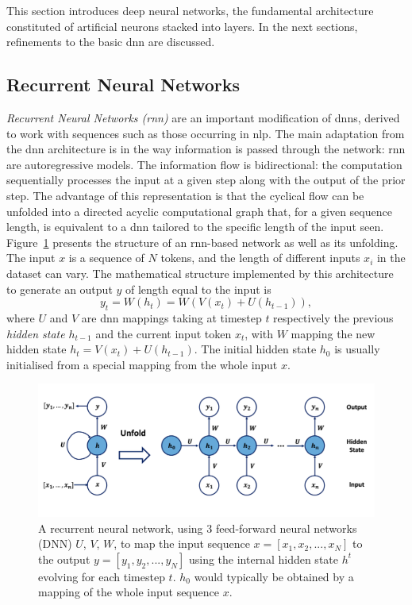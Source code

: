This section introduces deep neural networks, the fundamental architecture constituted of artificial neurons stacked into layers. In the next sections, refinements to the basic \gls{dnn} are discussed.

\subsection{Recurrent Neural Networks}\label{sec:RNN}
\textit{Recurrent Neural Networks (\gls{rnn})} are an important modification of \glspl{dnn}, derived to work with sequences such as those occurring in \gls{nlp}. The main adaptation from the \gls{dnn} architecture is in the way information is passed through the network: \gls{rnn} are autoregressive models. The information flow is bidirectional: the computation sequentially processes the input at a given step along with the output of the prior step. The advantage of this representation is that the cyclical flow can be unfolded into a directed acyclic computational graph that, for a given sequence length, is equivalent to a \gls{dnn} tailored to the specific length of the input seen. Figure~\ref{fig:rnnNet} presents the structure of an \gls{rnn}-based network as well as its unfolding. The input $x$ is a sequence of $N$ tokens, and the length of different inputs $x_i$ in the dataset can vary. The mathematical structure implemented by this architecture to generate an output $y$ of length equal to the input is
\begin{equation}\label{eq:rnnModel}
    y_t = W(h_t) = W(V(x_t) + U(h_{t-1})),
\end{equation}
where $U$ and $V$ are \gls{dnn} mappings taking at timestep $t$ respectively the previous \textit{hidden state} $h_{t-1}$ and the current input token $x_t$, with $W$ mapping the new hidden state $h_t = V(x_t) + U(h_{t-1})$. The initial hidden state $h_0$ is usually initialised from a special mapping from the whole input $x$.

\begin{figure}[h!]
    \center
    \includegraphics[scale=0.5]{Images/ML/rnn.png}
    \caption{A recurrent neural network, using 3 feed-forward neural networks (DNN) $U$, $V$, $W$, to map the input sequence $x = [x_1, x_2, ..., x_N]$ to the output $y = [y_1, y_2, ..., y_N]$ using the internal hidden state $h^t$ evolving for each timestep $t$. $h_0$ would typically be obtained by a mapping of the whole input sequence $x$. } 
    \label{fig:rnnNet}
\end{figure}

